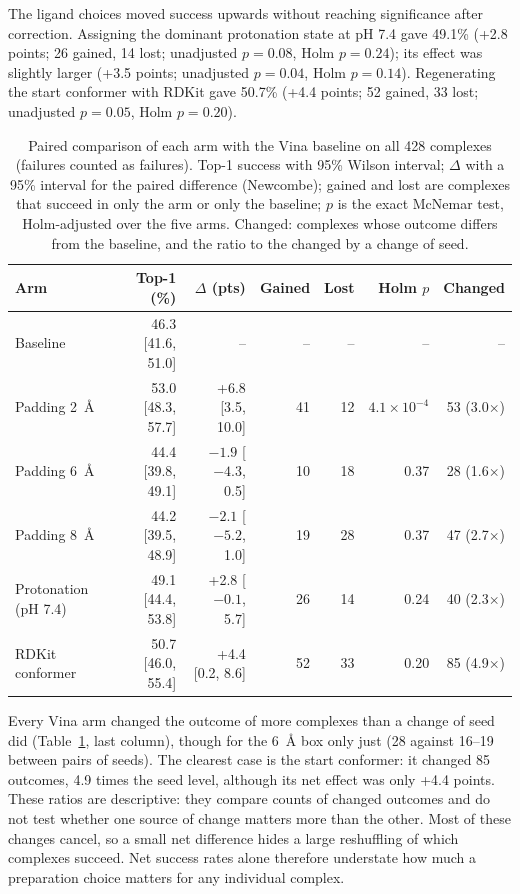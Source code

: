 The ligand choices moved success upwards without reaching significance after correction.
Assigning the dominant protonation state at pH 7.4 gave 49.1\% (+2.8 points; 26 gained, 14
lost; unadjusted $p = 0.08$, Holm $p = 0.24$); its \pbvalid{} effect was slightly larger
(+3.5 points; unadjusted $p = 0.04$, Holm $p = 0.14$). Regenerating the start conformer with
RDKit gave 50.7\% (+4.4 points; 52 gained, 33 lost; unadjusted $p = 0.05$, Holm
$p = 0.20$).

\begin{table}[h]
  \centering
  \caption{Paired comparison of each arm with the Vina baseline on all 428 complexes
    (failures counted as failures). Top-1 success with 95\% Wilson interval; $\Delta$ with
    a 95\% interval for the paired difference (Newcombe); gained and lost
    are complexes that succeed in only the arm or only the baseline; $p$ is the exact
    McNemar test, Holm-adjusted over the five arms. Changed: complexes whose outcome
    differs from the baseline, and the ratio to the  changed by a change of seed.}
  \label{tab:comparisons}
  \small
  \setlength{\tabcolsep}{4pt}
  \begin{tabular}{lrrrrrr}
    \toprule
    Arm & Top-1 (\%) & $\Delta$ (pts) & Gained & Lost & Holm $p$ & Changed \\
    \midrule
    Baseline & 46.3 [41.6, 51.0] & -- & -- & -- & -- & -- \\
    Padding \SI{2}{\angstrom} & 53.0 [48.3, 57.7] & +6.8 [3.5, 10.0] & 41 & 12 & $4.1\times10^{-4}$
      & 53 (3.0$\times$) \\
    Padding \SI{6}{\angstrom} & 44.4 [39.8, 49.1] & $-1.9$ [$-4.3$, 0.5] & 10 & 18 & 0.37 & 28 (1.6$\times$) \\
    Padding \SI{8}{\angstrom} & 44.2 [39.5, 48.9] & $-2.1$ [$-5.2$, 1.0] & 19 & 28 & 0.37 & 47 (2.7$\times$) \\
    Protonation (pH 7.4) & 49.1 [44.4, 53.8] & +2.8 [$-0.1$, 5.7] & 26 & 14 & 0.24 & 40 (2.3$\times$) \\
    RDKit conformer & 50.7 [46.0, 55.4] & +4.4 [0.2, 8.6] & 52 & 33 & 0.20 & 85 (4.9$\times$) \\
    \bottomrule
  \end{tabular}
\end{table}

Every Vina arm changed the outcome of more complexes than a change of seed did
(Table~\ref{tab:comparisons}, last column), though for the \SI{6}{\angstrom} box only just
(28 against 16--19 between pairs of seeds). The clearest case is the start conformer: it
changed 85 outcomes, 4.9 times the seed level, although its net effect was only +4.4
points. These ratios are descriptive: they compare counts of changed outcomes and do not
test whether one source of change matters more than the other. Most of these changes cancel, so a small net difference hides a large reshuffling of
which complexes succeed. Net success rates alone therefore understate how much a preparation
choice matters for any individual complex.

